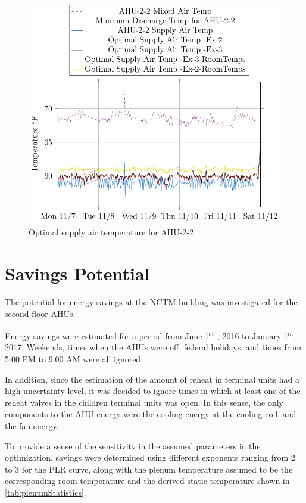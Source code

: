 \begin{figure}
\centering
\includegraphics[]{Plots/2016-11-16-1636-AHU22MixedAirTemp-TikzData.pdf}
\caption{Optimal supply air temperature for AHU-2-2.}
\label{fig:2016-11-16-1636-AHU22MixedAirTemp-TikzData}
\end{figure}

\section{Savings Potential}

The potential for energy savings at the NCTM building was investigated
for the second floor AHUs. 

Energy savings were estimated for a period from June
1\textsuperscript{st} , 2016 to January 1\textsuperscript{st}, 2017.
Weekends, times when the AHUs were off, federal holidays, and times from
5:00 PM to 9:00 AM were all ignored. 

In addition, since the estimation of the amount of reheat in terminal
units had a high uncertainty level, it was decided to ignore times in
which at least one of the reheat valves in the children terminal units
was open. In this sense, the only components to the AHU energy were the
cooling energy at the cooling coil, and the fan energy. 

To provide a sense of the sensitivity in the assumed parameters in the
optimization, savings were determined using different exponents ranging
from 2 to 3 for the PLR curve, along with the plenum temperature assumed
to be the corresponding room temperature and the derived static
temperature shown in \tableref{} \ref{tab:plenumStatistics}. 

